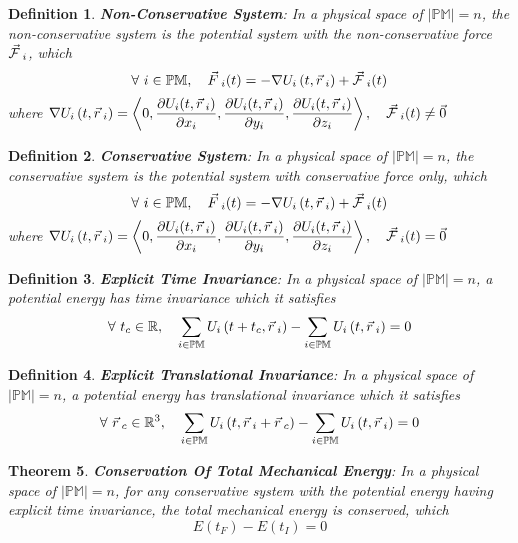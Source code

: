\documentclass[12pt]{amsart}
\newtheorem{theorem}{Theorem}[section]
\newtheorem{definition}[theorem]{Definition}
\let\oldvec\vec
\renewcommand{\vec}[1]{\oldvec{#1}\hspace{0.1em}}
\begin{document}
\begin{definition}
    \textbf{Non-Conservative System}: In a physical space of $\left | \mathbb{PM} \right | = n$, the non-conservative system is the potential system with the non-conservative force $\vec{\mathcal{F}}_i$, which $$\forall \  i \in \mathbb{PM}, \quad \vec{F}_i (t) = - \nabla U_i \left ( t, \vec{r}_i  \right) + \vec{\mathcal{F}}_i(t) $$ where $ \nabla  U_i \left ( t, \vec{r}_i \right )  = \left < 0, \dfrac{\partial U_i (t, \vec{r}_i)}{\partial x_i}, \dfrac{\partial U_i (t, \vec{r}_i)}{\partial y_i}, \dfrac{\partial U_i (t, \vec{r}_i)}{\partial z_i} \right >, \quad \vec{\mathcal{F}}_i (t) \ne \vec{0} $
\end{definition}

\begin{definition}
    \textbf{Conservative System}: In a physical space of $\left | \mathbb{PM} \right | = n$, the conservative system is the potential system with conservative force only, which $$\forall \  i \in \mathbb{PM}, \quad \vec{F}_i (t) = - \nabla U_i \left ( t, \vec{r}_i  \right) + \vec{\mathcal{F}}_i(t)$$ where $  \nabla  U_i \left ( t, \vec{r}_i \right )  = \left < 0, \dfrac{\partial U_i (t, \vec{r}_i)}{\partial x_i}, \dfrac{\partial U_i (t, \vec{r}_i)}{\partial y_i}, \dfrac{\partial U_i (t, \vec{r}_i)}{\partial z_i} \right >, \quad \vec{\mathcal{F}}_i (t) = \vec{0}$
\end{definition}

\begin{definition}
    \textbf{Explicit Time Invariance}: In a physical space of $\left | \mathbb{PM} \right | = n$, a potential energy has time invariance which it satisfies $$\forall \  t_c \in \mathbb{R}, \quad  \sum_{i \in \mathbb{PM}}   U_i \left ( t+t_c, \vec{r}_i \right ) - \sum_{i \in \mathbb{PM}}   U_i \left ( t, \vec{r}_i \right )  = 0 $$
\end{definition}

\begin{definition}
    \textbf{Explicit Translational Invariance}: In a physical space of $\left | \mathbb{PM} \right | = n$, a potential energy has translational invariance which it satisfies $$\forall \  \vec{r}_c \in \mathbb{R}^3, \quad  \sum_{i \in \mathbb{PM}}   U_i \left ( t, \vec{r}_i + \vec{r}_c \right ) - \sum_{i \in \mathbb{PM}}   U_i \left ( t, \vec{r}_i \right ) = 0 $$
\end{definition}

\begin{theorem}
    \textbf{Conservation Of Total Mechanical Energy}: In a physical space of $\left | \mathbb{PM} \right | = n$, for any conservative system with the potential energy having explicit time invariance, the total mechanical energy is conserved, which $$ E(t_F) -  E(t_I) = 0 $$
\end{theorem}
\end{document}

